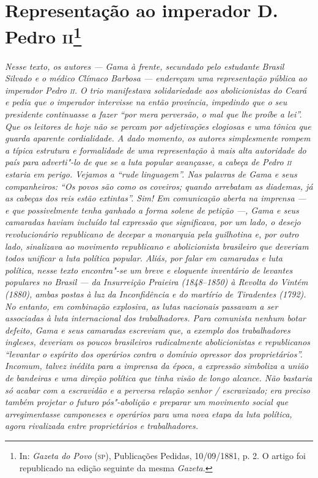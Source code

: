 \chapter{Representação ao imperador D.\,Pedro \textsc{ii}\footnote[*]{In:
  \emph{Gazeta do Povo} (\textsc{sp}), Publicações Pedidas, 10/09/1881, p. 2. O
  artigo foi republicado na edição seguinte da mesma \emph{Gazeta}.}}

\begin{flushleft}
{\footnotesize\itshape
Nesse texto, os autores --- Gama à frente, secundado pelo estudante
Brasil Silvado e o médico Clímaco Barbosa --- endereçam uma representação
pública ao imperador Pedro \textsc{ii}. O trio manifestava solidariedade aos
abolicionistas do Ceará e pedia que o imperador intervisse na então
província, impedindo que o seu presidente continuasse a fazer ``por mera
perversão, o mal que lhe proíbe a lei''. Que os leitores de hoje não se
percam por adjetivações elogiosas e uma tônica que guarda aparente
cordialidade. A dado momento, os autores simplesmente rompem a típica
estrutura e formalidade de uma representação à mais alta autoridade do
país para adverti"-lo de que se a luta popular avançasse, a cabeça de
Pedro \textsc{ii} estaria em perigo. Vejamos a ``rude linguagem''. Nas palavras de Gama e seus
companheiros: ``Os povos são como os coveiros; quando arrebatam as
diademas, já as cabeças dos reis estão extintas''. Sim! Em comunicação
aberta na imprensa --- e que possivelmente tenha ganhado a forma solene
de petição ---, Gama e seus camaradas haviam incluído tal expressão que
significava, por um lado, o desejo revolucionário republicano de decepar
a monarquia pela guilhotina e, por outro lado, sinalizava ao movimento republicano e
abolicionista brasileiro que deveriam todos unificar a luta política
popular. Aliás, por falar em camaradas e luta política, nesse texto
encontra"-se um breve e eloquente inventário de levantes populares no
Brasil --- da Insurreição Praieira (1848--1850) à Revolta do Vintém
(1880), ambas postas à luz da Inconfidência e do martírio de Tiradentes
(1792). No entanto, em combinação explosiva, as lutas nacionais passavam
a ser associadas à luta internacional dos trabalhadores. Para comunista
nenhum botar defeito, Gama e seus camaradas escreviam que, a exemplo dos
trabalhadores ingleses, deveriam os poucos brasileiros radicalmente
abolicionistas e republicanos ``levantar o espírito dos operários contra
o domínio opressor dos proprietários''. Incomum, talvez inédita para a
imprensa da época, a expressão simboliza a união de bandeiras e uma
direção política que tinha visão de longo alcance. Não bastaria só
acabar com a escravidão e a perversa relação senhor / escravizado; era
preciso também projetar o futuro pós"-abolição e preparar um movimento
social que arregimentasse camponeses e operários para uma nova etapa da
luta política, agora rivalizada entre proprietários e trabalhadores. }
\end{flushleft}


